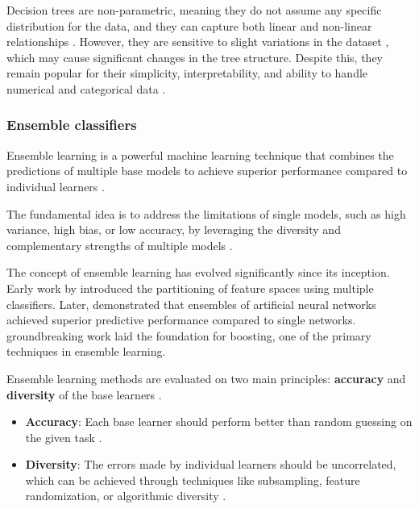 Decision trees are non-parametric, meaning they do not assume any specific distribution for the data, and they can capture both linear and non-linear relationships \parencite{Huang2024}. 
However, they are sensitive to slight variations in the dataset \parencite{Huang2024}, which may cause significant changes in the tree structure. 
Despite this, they remain popular for their simplicity, interpretability, and ability to handle numerical and categorical data \parencite{Chauhan2022}.

\subsubsection{Ensemble classifiers}

Ensemble learning is a powerful machine learning technique that combines the predictions of multiple base models to achieve superior performance compared to individual learners \parencite{Joseph2022}.

The fundamental idea is to address the limitations of single models, such as high variance, high bias, or low accuracy, by leveraging the diversity and complementary strengths of multiple models \parencite{Mienye2022, Dasarathy1979, Hansen1990}.

The concept of ensemble learning has evolved significantly since its inception. Early work by \textcite{Dasarathy1979} introduced the partitioning of feature spaces using multiple classifiers. 
Later, \textcite{Hansen1990} demonstrated that ensembles of artificial neural networks achieved superior predictive performance compared to single networks. 
\textcite{Schapire1990} groundbreaking work laid the foundation for boosting, one of the primary techniques in ensemble learning.

Ensemble learning methods are evaluated on two main principles: \textbf{accuracy} and \textbf{diversity} of the base learners \parencite{Hansen1990, Mienye2022}.

\begin{itemize}
    \item \textbf{Accuracy}: Each base learner should perform better than random guessing on the given task \parencite{Li2012}.
    \item \textbf{Diversity}: The errors made by individual learners should be uncorrelated, which can be achieved through techniques like subsampling, feature randomization, or algorithmic diversity \parencite{Schapire1990, Breiman1996}.
\end{itemize}


